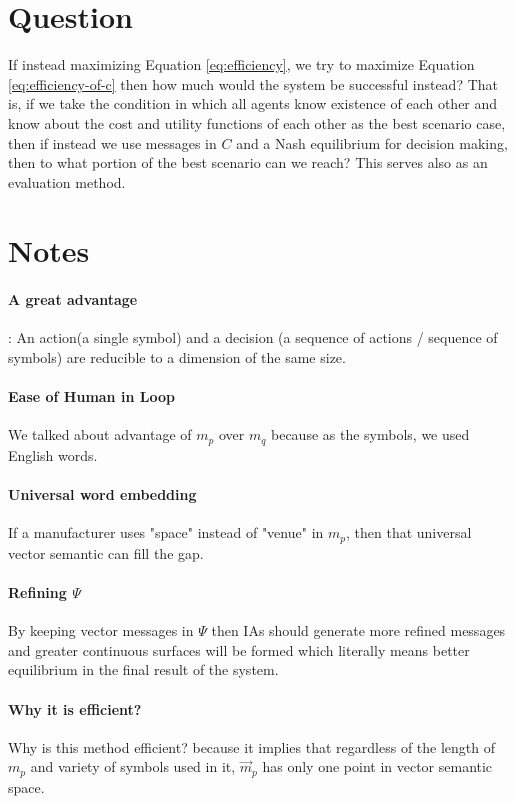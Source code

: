 \documentclass{article}
\begin{document}
\begin{multicols}{2}
		\section {Question} If instead maximizing Equation \ref{eq:efficiency}, we try to maximize Equation \ref{eq:efficiency-of-c} then how much would the system be successful instead? That is, if we take the condition in which all agents know existence of each other and know about the cost and utility functions of each other as the best scenario case, then if instead we use messages in $C$ and a Nash equilibrium for decision making, then to what portion of the best scenario can we reach? This serves also as an evaluation method.
		\section{Notes}
			\paragraph{A great advantage}: An action(a single symbol) and a decision (a sequence of actions / sequence of symbols) are reducible to a dimension of the same size.
			\paragraph{Ease of Human in Loop} We talked about advantage of $m_p$ over $m_q$ because as the symbols, we used English words. 
			\paragraph{Universal word embedding} If a manufacturer uses "space" instead of "venue" in $m_p$, then that universal vector semantic can fill the gap.
			\paragraph{Refining $\Psi$} By keeping vector messages in $\Psi$ then IAs should generate more refined messages and greater continuous surfaces will be formed which literally means better equilibrium in the final result of the system.
			\paragraph{Why it is efficient?} Why is this method efficient? because it implies that regardless of the length of $m_p$ and variety of symbols used in it, $\vec{m}_p$ has only one point in vector semantic space. 
	\end{multicols}
	
\end{document}
